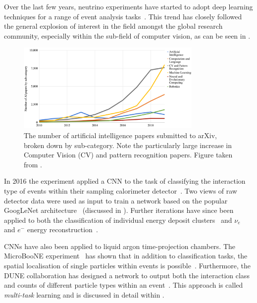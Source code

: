 Over the last few years, neutrino experiments have started to adopt deep learning techniques for a
range of event analysis tasks~\cite{psihas2020}. This trend has closely followed the general
explosion of interest in the field amongst the global research community, especially within the
sub-field of computer vision, as can be seen in .

\begin{figure} %
    \includegraphics[width=0.8\textwidth]{diagrams/6-cnn/papers.pdf}
    \caption[The number of artificial intelligence papers submitted to arXiv]
    {The number of artificial intelligence papers submitted to arXiv, broken down by sub-category.
        Note the particularly large increase in Computer Vision (CV) and pattern recognition
        papers. Figure taken from .}
    \label{fig:papers}
\end{figure}

In 2016 the \nova experiment applied a CNN to the task of classifying the interaction type of
events within their sampling calorimeter detector~\cite{aurisano2016}. Two views of raw detector
data were used as input to train a network based on the popular GoogLeNet
architecture~\cite{szegedy2015} (discussed in ). Further \nova
iterations have since been applied to both the classification of individual energy deposit
clusters~\cite{psihas2019} and $\nu_{e}$ and $e^{-}$ energy reconstruction~\cite{baldi2019}.

CNNs have also been applied to liquid argon time-projection chambers. The MicroBooNE
experiment~\cite{acciarri2017_ref} has shown that in addition to classification tasks, the spatial
localisation of single particles within events is possible~\cite{acciarri2017}. Furthermore, the
DUNE collaboration has designed a network to output both the interaction class and counts of
different particle types within an event~\cite{collaboration2020, abi2020}. This approach is
called \emph{multi-task} learning and is discussed in detail within
.

